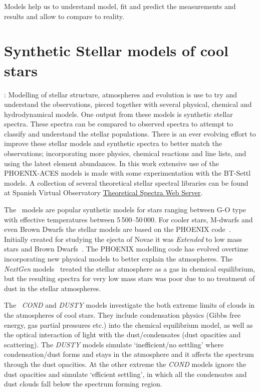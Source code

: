 
Models help us to understand model, fit and predict the measurements and results and allow to compare to reality.

\section{Synthetic Stellar models of cool stars}:
Modelling of stellar structure, atmospheres and evolution is use to try and understand the observations, pieced together with several physical, chemical and hydrodynamical models.
One output from these models is synthetic stellar spectra.
These spectra can be compared to observed spectra to attempt to classify and understand the stellar populations.
There is an ever evolving effort to improve these stellar models and synthetic spectra to better match the observations; incorporating more physics, chemical reactions and line lists, and using the latest element abundances.
In this work extensive use of the {PHOENIX-ACES} models is made with some experimentation with the {BT-Settl} models.
A collection of several theoretical stellar spectral libraries can be found at Spanish Virtual Observatory \href{http://svo2.cab.inta-csic.es/theory/newov/index.php}{Theoretical Spectra Web Server}.

The~\citet{kurucz_model_1979} models are popular synthetic models for stars ranging between G-O type with effective temperatures between 5\,500--50\,000\K.
For cooler stars, M-dwarfs and even Brown Dwarfs the stellar models are based on the {PHOENIX} code~\citep[e.g.][]{hauschildt_parallel_1997}.
Initially created for studying the ejecta of Novae it was \emph{Extended} to low mass stars and Brown Dwarfs~\citep{allard_model_1995}.
The PHOENIX modelling code has evolved overtime incorporating new physical models to better explain the atmospheres.
The \emph{NextGen} models~\citep{hauschildt_nextgen_1999b} treated the stellar atmosphere as a gas in chemical equilibrium, but the resulting spectra for very low mass stars was poor due to no treatment of dust in the stellar atmospheres.

The~\citep{allard_limiting_2001} \emph{COND} and \emph{DUSTY} models investigate the both extreme limits of clouds in the atmospheres of cool stars.
They include condensation physics (Gibbs free energy, gas partial pressures etc.) into the chemical equilibrium model, as well as the optical interaction of light with the dust/condensates (dust opacities and scattering).
The \emph{DUSTY} models simulate `inefficient/no settling' where condensation/dust forms and stays in the atmosphere and it affects the spectrum through the dust opacities.
At the other extreme the \emph{COND} models ignore the dust opacities and simulate `efficient settling', in which all the condensates and dust clouds fall below the spectrum forming region.

